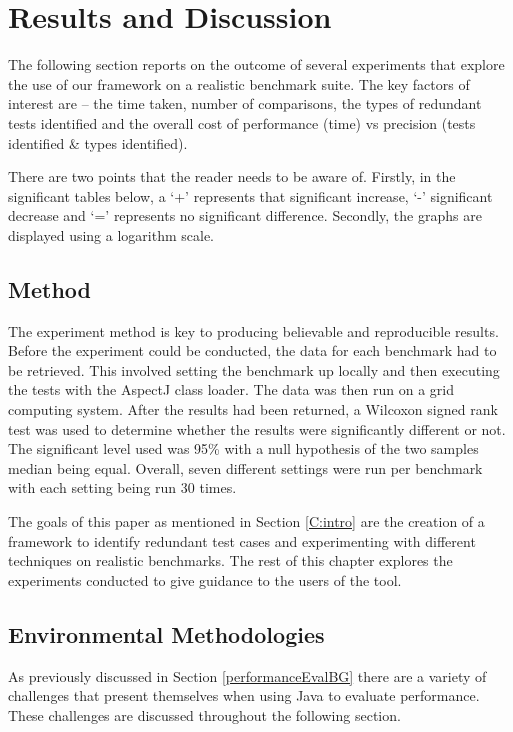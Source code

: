 \chapter{Results and Discussion}\label{C:results}\label{C:evaluation}

The following section reports on the outcome of several experiments that explore the use of our framework on a realistic benchmark suite. The key factors of interest are -- the time taken, number of comparisons, the types of redundant tests identified and the overall cost of performance (time) vs precision (tests identified \& types identified). 

There are two points that the reader needs to be aware of. Firstly, in the significant tables below, a `+' represents that significant increase, `-' significant decrease and `=' represents no significant difference. Secondly, the graphs are displayed using a logarithm scale.

\section{Method}

The experiment method is key to producing believable and reproducible results. Before the experiment could be conducted, the data for each benchmark had to be retrieved. This involved setting the benchmark up locally and then executing the tests with the AspectJ class loader. The data was then run on a grid computing system. After the results had been returned, a Wilcoxon signed rank test \cite{wilcoxon1945individual} was used to determine whether the results were significantly different or not. The significant level used was 95\% with a null hypothesis of the two samples median being equal. Overall, seven different settings were run per benchmark with each setting being run 30 times.

The goals of this paper as mentioned in Section \ref{C:intro} are the creation of a framework to identify redundant test cases and experimenting with different techniques on realistic benchmarks. The rest of this chapter explores the experiments conducted to give guidance to the users of the tool.

\section{Environmental Methodologies}
\label{enviro}
As previously discussed in Section \ref{performanceEvalBG} there are a variety of challenges that present themselves when using Java to evaluate performance. These challenges are discussed throughout the following section.

